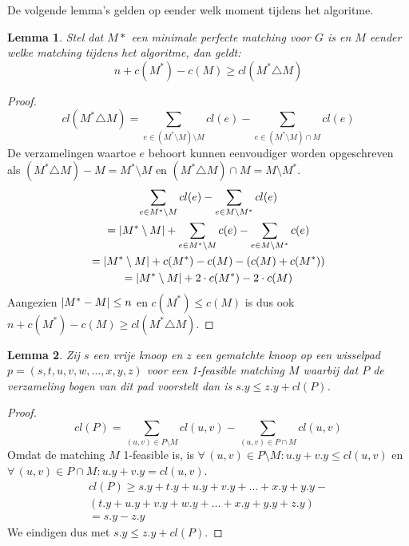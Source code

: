 \documentclass[conference]{IEEEtran}
\newtheorem{lemma}{Lemma}[section]
\theoremstyle{definition}
\theoremstyle{remark}
\DeclarePairedDelimiter{\card}{\vert}{\vert}  %
\let \oldforall \forall
\renewcommand{\forall}{\oldforall\,}
\begin{document}
De volgende lemma's gelden op eender welk moment tijdens het algoritme.

\begin{lemma}
    Stel dat $M*$ een minimale perfecte matching voor $G$ is en $M$ eender welke matching tijdens het algoritme, dan geldt:
    \begin{equation*}
        n + c(M^*) - c(M) \geq cl(M^* \triangle M)
    \end{equation*}
\end{lemma}
\begin{proof}
    \begin{equation*}
        cl(M^* \triangle M) = \sum_{e \in (M^* \setminus M) \setminus M} cl(e) - \sum_{e \in (M^* \setminus M) \cap M} cl(e)
    \end{equation*}
    De verzamelingen waartoe $e$ behoort kunnen eenvoudiger worden opgeschreven als $(M^* \triangle M) - M = M^* \setminus M$ en $(M^* \triangle M) \cap M = M \setminus M^*$.
    \begin{gather*}
        \sum_{e \in M^* \setminus M} cl(e) - \sum_{e \in M \setminus M^*} cl(e) \\
        = \card{M^* \setminus M} + \sum_{e \in M^* \setminus M} c(e) - \sum_{e \in M \setminus M^*} c(e) \\
        = \card{M^* \setminus M} + c(M^*) - c(M) - (c(M) + c(M^*)) \\
        = \card{M^* \setminus M} + 2 \cdot c(M^*) - 2 \cdot c(M) \\
    \end{gather*}
    Aangezien $\card{M^* - M} \leq n$ en $c(M^*) \leq c(M)$ is dus ook $n + c(M^*) - c(M) \geq cl(M^* \triangle M)$.
\end{proof}

\begin{lemma}
    Zij $s$ een vrije knoop en $z$ een gematchte knoop op een wisselpad $p = (s, t, u, v, w, \dots, x, y, z)$ voor een 1-feasible matching $M$ waarbij dat $P$ de verzameling bogen van dit pad voorstelt dan is $s.y \leq z.y + cl(P)$.
\end{lemma}
\begin{proof}
    \begin{equation*}
        cl(P) = \sum_{(u, v) \in P \setminus M} cl(u, v) - \sum_{(u, v) \in P \cap M} cl(u, v)
    \end{equation*}
    Omdat de matching $M$ 1-feasible is, is $\forall (u, v) \in P \setminus M: u.y + v.y \leq cl(u, v)$ en $\forall (u, v) \in P \cap M: u.y + v.y = cl(u, v)$.
    \begin{gather*}
        cl(P) \geq s.y + t.y + u.y + v.y + \dots + x.y + y.y - \\
        (t.y + u.y + v.y + w.y + \dots + x.y + y.y + z.y) \\
        = s.y - z.y
    \end{gather*}
    We eindigen dus met $s.y \leq z.y + cl(P)$.
\end{proof}
\end{document}
